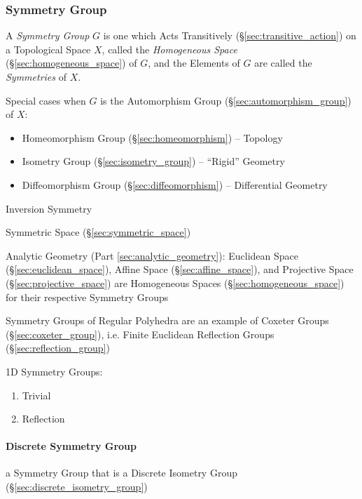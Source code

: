 \begin{itemize}
\subsubsection{Symmetry Group}\label{sec:symmetry_group}

A \emph{Symmetry Group} $G$ is one which Acts Transitively
(\S\ref{sec:transitive_action}) on a Topological Space $X$, called the
\emph{Homogeneous Space} (\S\ref{sec:homogeneous_space}) of $G$, and the Elements
of $G$ are called the \emph{Symmetries} of $X$.

Special cases when $G$ is the Automorphism Group
(\S\ref{sec:automorphism_group}) of $X$:
\begin{itemize}
  \item Homeomorphism Group (\S\ref{sec:homeomorphism}) -- Topology
  \item Isometry Group (\S\ref{sec:isometry_group}) -- ``Rigid'' Geometry
  \item Diffeomorphism Group (\S\ref{sec:diffeomorphism}) -- Differential
    Geometry
\end{itemize}


Inversion Symmetry %

\fist Symmetric Space (\S\ref{sec:symmetric_space})

Analytic Geometry (Part \ref{sec:analytic_geometry}): Euclidean Space
(\S\ref{sec:euclidean_space}), Affine Space (\S\ref{sec:affine_space}), and
Projective Space (\S\ref{sec:projective_space}) are Homogeneous Spaces
(\S\ref{sec:homogeneous_space}) for their respective Symmetry Groups

Symmetry Groups of Regular Polyhedra are an example of Coxeter Groups
(\S\ref{sec:coxeter_group}), i.e. Finite Euclidean Reflection Groups
(\S\ref{sec:reflection_group})

1D Symmetry Groups: %
\begin{enumerate}
  \item Trivial
  \item Reflection
\end{enumerate}



\paragraph{Discrete Symmetry Group}\label{sec:discrete_symmetry_group}\hfill

a Symmetry Group that is a Discrete Isometry Group
(\S\ref{sec:discrete_isometry_group})




\end{itemize}
